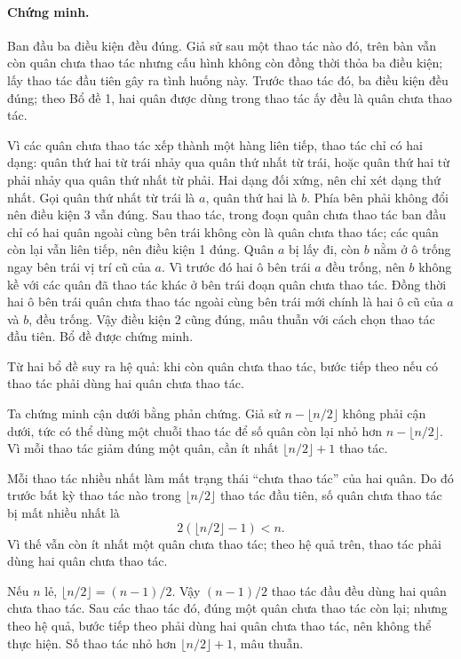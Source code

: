 \documentclass[11pt]{article}
\begin{document}
\paragraph{Chứng minh.}
Ban đầu ba điều kiện đều đúng. Giả sử sau một thao tác nào đó, trên bàn vẫn còn
quân chưa thao tác nhưng cấu hình không còn đồng thời thỏa ba điều kiện; lấy
thao tác đầu tiên gây ra tình huống này. Trước thao tác đó, ba điều kiện đều
đúng; theo Bổ đề 1, hai quân được dùng trong thao tác ấy đều là quân chưa thao
tác.

Vì các quân chưa thao tác xếp thành một hàng liên tiếp, thao tác chỉ có hai
dạng: quân thứ hai từ trái nhảy qua quân thứ nhất từ trái, hoặc quân thứ hai
từ phải nhảy qua quân thứ nhất từ phải. Hai dạng đối xứng, nên chỉ xét dạng
thứ nhất. Gọi quân thứ nhất từ trái là \(a\), quân thứ hai là \(b\). Phía bên
phải không đổi nên điều kiện 3 vẫn đúng. Sau thao tác, trong đoạn quân chưa
thao tác ban đầu chỉ có hai quân ngoài cùng bên trái không còn là quân chưa
thao tác; các quân còn lại vẫn liên tiếp, nên điều kiện 1 đúng. Quân \(a\) bị
lấy đi, còn \(b\) nằm ở ô trống ngay bên trái vị trí cũ của \(a\). Vì trước đó
hai ô bên trái \(a\) đều trống, nên \(b\) không kề với các quân đã thao tác
khác ở bên trái đoạn quân chưa thao tác. Đồng thời hai ô bên trái quân chưa
thao tác ngoài cùng bên trái mới chính là hai ô cũ của \(a\) và \(b\), đều
trống. Vậy điều kiện 2 cũng đúng, mâu thuẫn với cách chọn thao tác đầu tiên.
Bổ đề được chứng minh.

Từ hai bổ đề suy ra hệ quả: khi còn quân chưa thao tác, bước tiếp theo nếu có
thao tác phải dùng hai quân chưa thao tác.

Ta chứng minh cận dưới bằng phản chứng. Giả sử
\(n-\lfloor n/2\rfloor\) không phải cận dưới, tức có thể dùng một chuỗi thao
tác để số quân còn lại nhỏ hơn \(n-\lfloor n/2\rfloor\). Vì mỗi thao tác giảm
đúng một quân, cần ít nhất \(\lfloor n/2\rfloor+1\) thao tác.

Mỗi thao tác nhiều nhất làm mất trạng thái ``chưa thao tác'' của hai quân. Do
đó trước bất kỳ thao tác nào trong \(\lfloor n/2\rfloor\) thao tác đầu tiên,
số quân chưa thao tác bị mất nhiều nhất là
\[
  2(\lfloor n/2\rfloor-1)<n.
\]
Vì thế vẫn còn ít nhất một quân chưa thao tác; theo hệ quả trên, thao tác phải
dùng hai quân chưa thao tác.

Nếu \(n\) lẻ, \(\lfloor n/2\rfloor=(n-1)/2\). Vậy \((n-1)/2\) thao tác đầu
đều dùng hai quân chưa thao tác. Sau các thao tác đó, đúng một quân chưa thao
tác còn lại; nhưng theo hệ quả, bước tiếp theo phải dùng hai quân chưa thao
tác, nên không thể thực hiện. Số thao tác nhỏ hơn
\(\lfloor n/2\rfloor+1\), mâu thuẫn.
\end{document}

